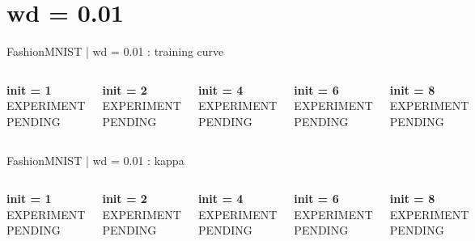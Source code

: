 \documentclass[aspectratio=169]{beamer}
\begin{document}
\section{wd = 0.01}
\begin{frame}{FashionMNIST | wd = 0.01 : training curve}
\begin{columns}[T,onlytextwidth]

    \centering
\textbf{init = 1}\\[0.5em]
\vfill
{\Large EXPERIMENT PENDING}
\vfill

    \centering
\textbf{init = 2}\\[0.5em]
\vfill
{\Large EXPERIMENT PENDING}
\vfill

    \centering
\textbf{init = 4}\\[0.5em]
\vfill
{\Large EXPERIMENT PENDING}
\vfill

    \centering
\textbf{init = 6}\\[0.5em]
\vfill
{\Large EXPERIMENT PENDING}
\vfill

    \centering
\textbf{init = 8}\\[0.5em]
\vfill
{\Large EXPERIMENT PENDING}
\vfill
\end{columns}
\end{frame}
\begin{frame}{FashionMNIST | wd = 0.01 : kappa}
\begin{columns}[T,onlytextwidth]

    \centering
\textbf{init = 1}\\[0.5em]
\vfill
{\Large EXPERIMENT PENDING}
\vfill

    \centering
\textbf{init = 2}\\[0.5em]
\vfill
{\Large EXPERIMENT PENDING}
\vfill

    \centering
\textbf{init = 4}\\[0.5em]
\vfill
{\Large EXPERIMENT PENDING}
\vfill

    \centering
\textbf{init = 6}\\[0.5em]
\vfill
{\Large EXPERIMENT PENDING}
\vfill

    \centering
\textbf{init = 8}\\[0.5em]
\vfill
{\Large EXPERIMENT PENDING}
\vfill
\end{columns}
\end{frame}
\end{document}
